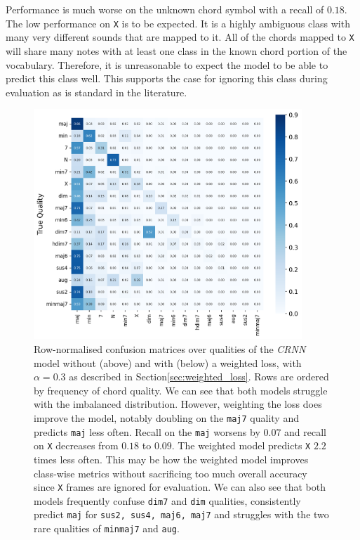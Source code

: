 Performance is much worse on the unknown chord symbol with a recall of $0.18$. The low performance on \texttt{X} is to be expected. It is a highly ambiguous class with many very different sounds that are mapped to it. All of the chords mapped to \texttt{X} will share many notes with at least one class in the known chord portion of the vocabulary. Therefore, it is unreasonable to expect the model to be able to predict this class well. This supports the case for ignoring this class during evaluation as is standard in the literature.

\begin{figure}[H]
    \centering
    \includegraphics[width=0.9\textwidth]{figures/confusion_matrix_qualities.png}
    \caption{Row-normalised confusion matrices over qualities of the \emph{CRNN} model without (above) and with (below) a weighted loss, with $\alpha = 0.3$ as described in Section\ref{sec:weighted_loss}. Rows are ordered by frequency of chord quality. We can see that both models struggle with the imbalanced distribution. However, weighting the loss does improve the model, notably doubling on the \texttt{maj7} quality and predicts \texttt{maj} less often. Recall on the \texttt{maj} worsens by $0.07$ and recall on \texttt{X} decreases from $0.18$ to $0.09$. The weighted model predicts \texttt{X} $2.2$ times less often. This may be how the weighted model improves class-wise metrics without sacrificing too much overall accuracy since \texttt{X} frames are ignored for evaluation. We can also see that both models frequently confuse \texttt{dim7} and \texttt{dim} qualities, consistently predict \texttt{maj} for \texttt{sus2, sus4, maj6, maj7} and struggles with the two rare qualities of \texttt{minmaj7} and \texttt{aug}.}\label{fig:crnn_qual_cm}
\end{figure}


